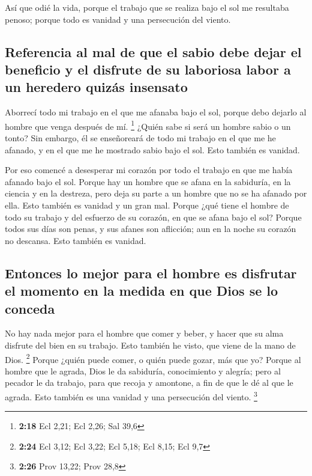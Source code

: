 \begin{paracol}{2}
 Así que odié la vida, porque el trabajo que se realiza
bajo el sol me resultaba penoso; porque todo es vanidad y una
persecución del viento.

\hypertarget{referencia-al-mal-de-que-el-sabio-debe-dejar-el-beneficio-y-el-disfrute-de-su-laboriosa-labor-a-un-heredero-quizuxe1s-insensato}{%
\subsection{Referencia al mal de que el sabio debe dejar el beneficio y
el disfrute de su laboriosa labor a un heredero quizás
insensato}\label{referencia-al-mal-de-que-el-sabio-debe-dejar-el-beneficio-y-el-disfrute-de-su-laboriosa-labor-a-un-heredero-quizuxe1s-insensato}}

 Aborrecí todo mi trabajo en el que me afanaba bajo el
sol, porque debo dejarlo al hombre que venga después de mí. \footnote{\textbf{2:18}
  Ecl 2,21; Ecl 2,26; Sal 39,6}  ¿Quién sabe si será un
hombre sabio o un tonto? Sin embargo, él se enseñoreará de todo mi
trabajo en el que me he afanado, y en el que me he mostrado sabio bajo
el sol. Esto también es vanidad.

 Por eso comencé a desesperar mi corazón por todo el
trabajo en que me había afanado bajo el sol.  Porque hay
un hombre que se afana en la sabiduría, en la ciencia y en la destreza,
pero deja su parte a un hombre que no se ha afanado por ella. Esto
también es vanidad y un gran mal.  Porque ¿qué tiene el
hombre de todo su trabajo y del esfuerzo de su corazón, en que se afana
bajo el sol?  Porque todos sus días son penas, y sus
afanes son aflicción; aun en la noche su corazón no descansa. Esto
también es vanidad.

\hypertarget{entonces-lo-mejor-para-el-hombre-es-disfrutar-el-momento-en-la-medida-en-que-dios-se-lo-conceda}{%
\subsection{Entonces lo mejor para el hombre es disfrutar el momento en
la medida en que Dios se lo
conceda}\label{entonces-lo-mejor-para-el-hombre-es-disfrutar-el-momento-en-la-medida-en-que-dios-se-lo-conceda}}

 No hay nada mejor para el hombre que comer y beber, y
hacer que su alma disfrute del bien en su trabajo. Esto también he
visto, que viene de la mano de Dios. \footnote{\textbf{2:24} Ecl 3,12;
  Ecl 3,22; Ecl 5,18; Ecl 8,15; Ecl 9,7}  Porque ¿quién
puede comer, o quién puede gozar, más que yo?  Porque al
hombre que le agrada, Dios le da sabiduría, conocimiento y alegría; pero
al pecador le da trabajo, para que recoja y amontone, a fin de que le dé
al que le agrada. Esto también es una vanidad y una persecución del
viento. \footnote{\textbf{2:26} Prov 13,22; Prov 28,8}


\end{paracol}
